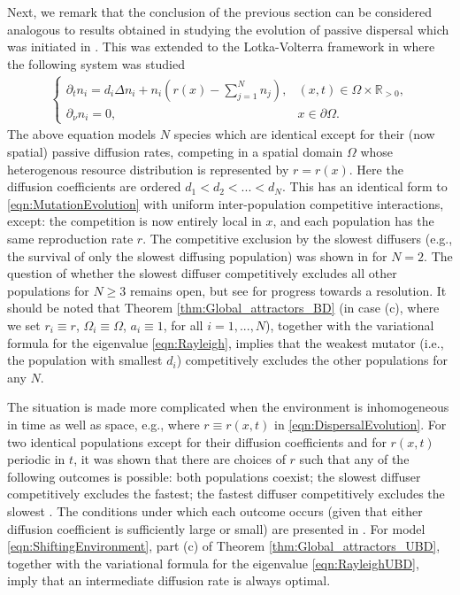 \documentclass{article}
\begin{document}
Next, we remark that the conclusion of the previous section can be considered analogous to results obtained in studying the evolution of passive dispersal which was initiated in \cite{hastings1983can}. This was extended to the Lotka-Volterra framework in \cite{dockery1998evolution} where the following system was studied
\begin{align}\label{eqn:DispersalEvolution}
  \begin{cases}
      \partial_tn_i=d_i\Delta{}n_i+n_i\left(r(x)-\sum_{j=1}^N n_j\right),&(x,t)\in\Omega\times{}\mathbb{R}_{>0},\\
      \partial_{\nu}n_i=0,&x\in\partial\Omega.
  \end{cases}  
\end{align}
The above equation models  $N$ species which are identical except for their (now spatial) passive diffusion rates, competing in a spatial domain  $\Omega$ whose heterogenous resource distribution is represented by $r=r(x)$. Here the diffusion coefficients are ordered $d_1<d_2<...<d_N$. This has an identical form to \eqref{eqn:MutationEvolution} with uniform inter-population competitive interactions, except: the competition is now entirely local in $x$, and each population has the same reproduction rate $r$. The competitive exclusion by the slowest diffusers (e.g., the survival of only the slowest diffusing population) was shown in \cite{dockery1998evolution} for $N=2$. The question of whether the slowest diffuser competitively excludes all other populations for $N\geq{}3$ remains open, but see \cite{cantrell2021evolution} for progress towards a resolution. It should be noted that Theorem \ref{thm:Global_attractors_BD} (in case (c), where we set $r_i\equiv{}r$, $\Omega_i\equiv\Omega$, $a_i\equiv1$, for all $i=1,...,N$), together with the variational formula for the eigenvalue \eqref{eqn:Rayleigh}, implies that the weakest mutator (i.e., the population with smallest $d_i$) competitively excludes the other populations for any $N$.



The situation is made more complicated when the environment is inhomogeneous in time as well as space, e.g., where $r\equiv{}r(x,t)$ in \eqref{eqn:DispersalEvolution}. For two identical populations except for their diffusion coefficients and for $r(x,t)$ periodic in $t$, it was shown  that there are choices of $r$ such that any of the following outcomes is possible: both populations coexist; the slowest diffuser competitively excludes the fastest; the fastest diffuser competitively excludes the slowest \cite{hutson2001evolution}. The conditions under which each outcome occurs (given that either diffusion coefficient is sufficiently large or small) are presented in \cite{bai2022dynamics}. For model \eqref{eqn:ShiftingEnvironment}, part (c) of Theorem \ref{thm:Global_attractors_UBD}, together with the variational formula for the eigenvalue \eqref{eqn:RayleighUBD}, imply that an intermediate diffusion rate is always optimal.
\end{document}
